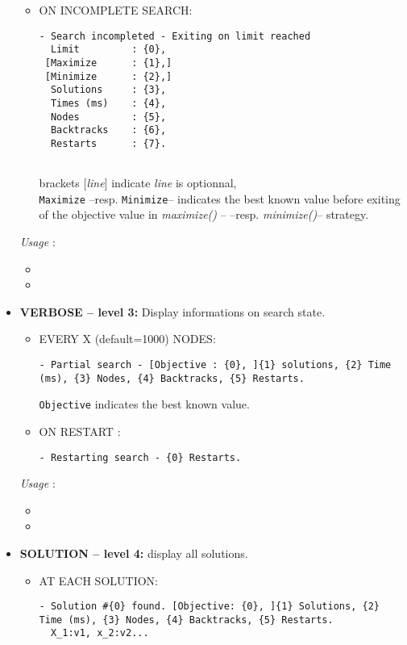 \begin{itemize}
\begin{itemize}
			\item ON INCOMPLETE SEARCH:
				\begin{lstlisting}
- Search incompleted - Exiting on limit reached
  Limit			: {0},
 [Maximize		: {1},]
 [Minimize		: {2},]
  Solutions		: {3},
  Times (ms)	: {4},
  Nodes			: {5},
  Backtracks	: {6},
  Restarts		: {7}.
  
  \end{lstlisting}
	brackets [\textit{line}] indicate \textit{line} is optionnal,\\
 	\texttt{Maximize} --resp. \texttt{Minimize}-- indicates the best known value before exiting of the objective value in \textit{maximize()} -- --resp. \textit{minimize()}-- strategy.
		\end{itemize}			

	\textit{Usage} : 
		\begin{itemize}
		\item {}
		\item {}
		\end{itemize}

	\item \textbf{VERBOSE -- level 3:} Display informations on search state.
		\begin{itemize}
			\item EVERY X (default=1000) NODES:
			\begin{lstlisting}
- Partial search - [Objective : {0}, ]{1} solutions, {2} Time (ms), {3} Nodes, {4} Backtracks, {5} Restarts.
			\end{lstlisting}
			\texttt{Objective} indicates the best known value.

			\item ON RESTART : 
			\begin{lstlisting}
- Restarting search - {0} Restarts.
			\end{lstlisting}
		\end{itemize}
		
		\textit{Usage} : 
		\begin{itemize}
		\item {}
		\item {}
		\end{itemize}

	\item \textbf{SOLUTION -- level 4:} display all solutions.
		\begin{itemize}
			\item AT EACH SOLUTION:
			\begin{lstlisting}
- Solution #{0} found. [Objective: {0}, ]{1} Solutions, {2} Time (ms), {3} Nodes, {4} Backtracks, {5} Restarts.
  X_1:v1, x_2:v2...
			\end{lstlisting}
		\end{itemize}
		

\end{itemize}
